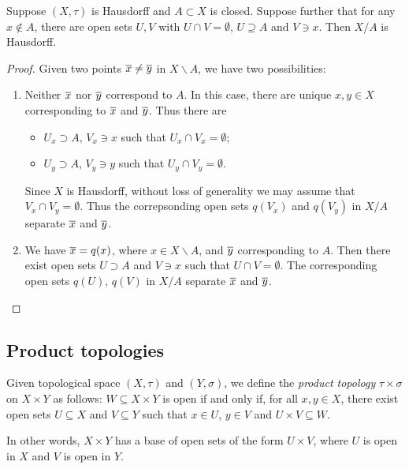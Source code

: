 \begin{lemma}
	Suppose $(X,\tau)$ is Hausdorff and $A \subset X$ is closed. Suppose further that for any $x\not\in A$, there are open sets $U,V$ with $U\cap V=\emptyset$, $U \supseteq A$ and $V \ni x$. Then $X/A$ is Hausdorff.
\end{lemma}

\begin{proof}
	Given two points $\overline{x} \neq \overline{y}$ in $X\backslash A$, we have two possibilities:
	\begin{enumerate}
		\item Neither $\overline{x}$ nor $\overline{y}$ correspond to $A$. In this case, there are unique $x,y\in X$ corresponding to $\overline{x}$ and $\overline{y}$. Thus there are
		\begin{itemize}
			\shortskip
			\item [] $U_x\supset A$, $V_x\ni x$ such that $U_x \cap V_x=\emptyset$;
			\item [] $U_y\supset A$, $V_y\ni y$ such that $U_y \cap V_y=\emptyset$.
		\end{itemize}
		Since $X$ is Hausdorff, without loss of generality we may assume that $V_x \cap V_y = \emptyset$. Thus the correpsonding open sets $q(V_x)$ and $q(V_y)$ in $X/A$ separate $\overline{x}$ and $\overline{y}$.

		\item We have $\overline{x}=q(x)$, where $x\in X\backslash A$, and $\overline{y}$ corresponding to $A$. Then there exist open sets $U\supset A$ and $V \ni x$ such that $U\cap V = \emptyset$. The corresponding open sets $q(U)$, $q(V)$ in $X/A$ separate $\overline{x}$ and $\overline{y}$. \qedhere
	\end{enumerate}
\end{proof}


\subsection{Product topologies} %
\label{sub:product_topologies}

\begin{definition}
	Given topological space $(X,\tau)$ and $(Y,\sigma)$, we define the \emph{product topology} $\tau\times \sigma$ on $X\times Y$ as follows: $W\subseteq X\times Y$ is open if and only if, for all $x,y\in X$, there exist open sets $U\subseteq X$ and $V\subseteq Y$ such that $x\in U$, $y\in V$ and $U\times V \subseteq W$.

	In other words, $X\times Y$ has a base of open sets of the form $U\times V$, where $U$ is open in $X$ and $V$ is open in $Y$.
\end{definition}


